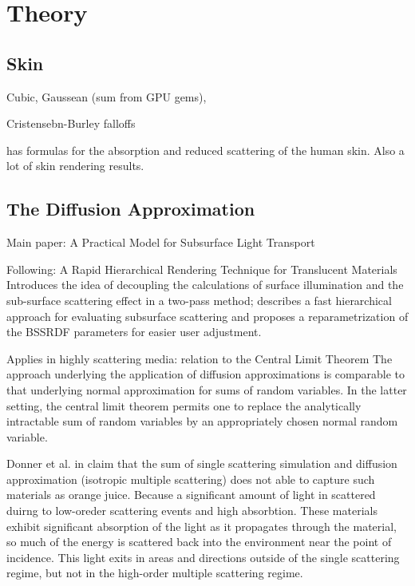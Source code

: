 \chapter{Theory}
\label{chapter:Theory}

\section{Skin}

Cubic, Gaussean (sum from GPU gems),

Cristensebn-Burley falloffs 

\cite{EGWR:EGSR06:409-417} has formulas for the absorption and reduced scattering of the human skin. Also a lot of skin rendering results.

\section{The Diffusion Approximation}
Main paper: A Practical Model for Subsurface Light Transport \cite{Jensen:2001:PMS:383259.383319}

Following: A Rapid Hierarchical Rendering Technique for Translucent Materials\\
\cite{Jensen:2002:RHR:566570.566619} Introduces the idea of decoupling the calculations of surface
illumination and the sub-surface scattering effect in a two-pass method;
describes a fast hierarchical approach for evaluating subsurface scattering
and proposes a reparametrization of the BSSRDF parameters for easier user adjustment.

Applies in highly scattering media: relation to the Central Limit Theorem
The approach underlying the application of diffusion approximations is comparable to that underlying normal approximation for
sums of random variables. In the latter setting, the central limit theorem
permits one to replace the analytically intractable sum of random variables by
an appropriately chosen normal random variable.

Donner et al. in \cite{Donner:2009:EBM} claim that the sum of single scattering
simulation and diffusion approximation (isotropic multiple scattering) does not
able to capture such materials as orange juice. Because a significant amount of
light in scattered duirng to low-oreder scattering events and high absorbtion.
These materials exhibit significant absorption of the light as it propagates
through the material, so much of the energy is scattered back into
the environment near the point of incidence. This light exits in areas and
directions outside of the single scattering regime, but not in the high-order
multiple scattering regime.

